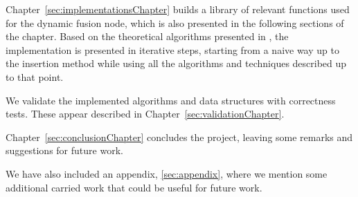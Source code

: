 Chapter~\ref{sec:implementationsChapter} builds a library of relevant functions used for the dynamic fusion node, which is also presented in the following sections of the chapter.
Based on the theoretical algorithms presented in \cite{patrascu2014dynamic}, the implementation is presented in iterative steps, starting from a naive way up to the insertion method while using all the algorithms and techniques described up to that point.

We validate the implemented algorithms and data structures with correctness tests. These appear described in Chapter~\ref{sec:validationChapter}.

Chapter~\ref{sec:conclusionChapter} concludes the project, leaving some remarks and suggestions for future work.

We have also included an appendix, \ref{sec:appendix}, where we mention some additional carried work that could be useful for future work.

